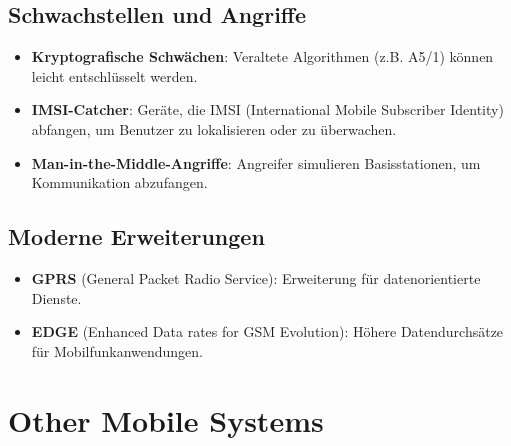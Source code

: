 \documentclass{article}
\begin{document}
\subsection{Schwachstellen und Angriffe}
\begin{itemize}
    \item \textbf{Kryptografische Schwächen}: Veraltete Algorithmen (z.B. A5/1) können leicht entschlüsselt werden.
    \item \textbf{IMSI-Catcher}: Geräte, die IMSI (International Mobile Subscriber Identity) abfangen, um Benutzer zu lokalisieren oder zu überwachen.
    \item \textbf{Man-in-the-Middle-Angriffe}: Angreifer simulieren Basisstationen, um Kommunikation abzufangen.
\end{itemize}

\subsection{Moderne Erweiterungen}
\begin{itemize}
    \item \textbf{GPRS} (General Packet Radio Service): Erweiterung für datenorientierte Dienste.
    \item \textbf{EDGE} (Enhanced Data rates for GSM Evolution): Höhere Datendurchsätze für Mobilfunkanwendungen.
\end{itemize}


\section{Other Mobile Systems}
\end{document}
